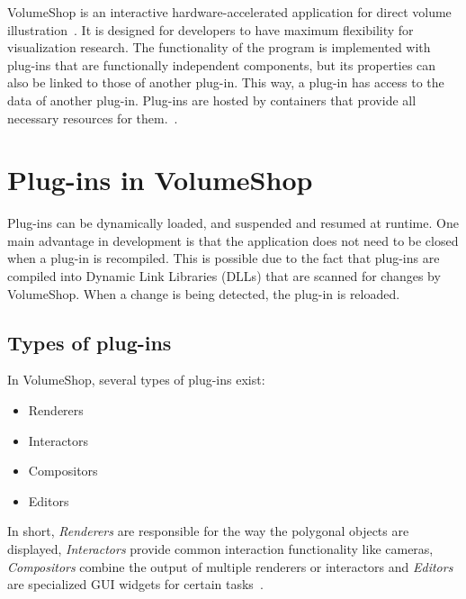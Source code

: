 

VolumeShop is an interactive hardware-accelerated application for direct volume illustration~\cite{proc:volumeshop}. It is designed for developers to have maximum flexibility for visualization research. The functionality of the program is implemented with plug-ins that are functionally independent components, but its properties can also be linked to those of another plug-in. This way, a plug-in has access to the data of another plug-in. Plug-ins are hosted by containers that provide all necessary resources for them.~\cite{misc:volumeshop101}.\\

\section{Plug-ins in VolumeShop}
Plug-ins can be dynamically loaded, and suspended and resumed at runtime. One main advantage in development is that the application does not need to be closed when a plug-in is recompiled. This is possible due to the fact that plug-ins are compiled into Dynamic Link Libraries (DLLs) that are scanned for changes by VolumeShop. When a change is being detected, the plug-in is reloaded.

\subsection{Types of plug-ins}
In VolumeShop, several types of plug-ins exist:
\begin{itemize}
	\item Renderers
	\item Interactors
	\item Compositors
	\item Editors
\end{itemize}
In short, \emph{Renderers} are responsible for the way the polygonal objects are displayed, \emph{Interactors} provide common interaction functionality like cameras, \emph{Compositors} combine the output of multiple renderers or interactors and \emph{Editors} are specialized GUI widgets for certain tasks~\cite{misc:volumeshop101}.


